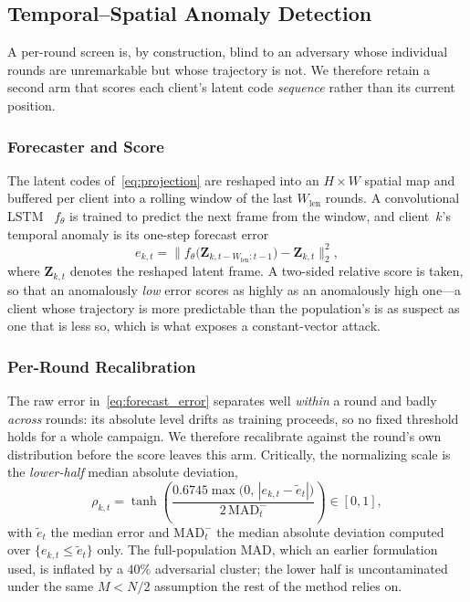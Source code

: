 \documentclass[journal]{IEEEtran}
\begin{document}
\subsection{Temporal--Spatial Anomaly Detection}
\label{sec:temporal}

A per-round screen is, by construction, blind to an adversary whose individual rounds are unremarkable but whose trajectory is not. We therefore retain a second arm that scores each client's latent code \emph{sequence} rather than its current position.

\subsubsection{Forecaster and Score}
The latent codes of~\eqref{eq:projection} are reshaped into an $H \times W$ spatial map and buffered per client into a rolling window of the last $W_{\mathrm{len}}$ rounds. A convolutional LSTM~\cite{shi2015convolutional} $f_\theta$ is trained to predict the next frame from the window, and client~$k$'s temporal anomaly is its one-step forecast error
\begin{equation}
e_{k,t} = \bigl\| f_\theta\bigl( \mathbf{Z}_{k,t-W_{\mathrm{len}}:t-1} \bigr) - \mathbf{Z}_{k,t} \bigr\|_2^2 ,
\label{eq:forecast_error}
\end{equation}
where $\mathbf{Z}_{k,t}$ denotes the reshaped latent frame. A two-sided relative score is taken, so that an anomalously \emph{low} error scores as highly as an anomalously high one---a client whose trajectory is more predictable than the population's is as suspect as one that is less so, which is what exposes a constant-vector attack.

\subsubsection{Per-Round Recalibration}
The raw error in~\eqref{eq:forecast_error} separates well \emph{within} a round and badly \emph{across} rounds: its absolute level drifts as training proceeds, so no fixed threshold holds for a whole campaign. We therefore recalibrate against the round's own distribution before the score leaves this arm. Critically, the normalizing scale is the \emph{lower-half} median absolute deviation,
\begin{equation}
\rho_{k,t} = \tanh\!\left( \frac{0.6745 \max\bigl(0,\, |e_{k,t} - \tilde{e}_t| \bigr)}{2\,\mathrm{MAD}^{-}_t} \right) \in [0,1],
\label{eq:temporal_rel}
\end{equation}
with $\tilde{e}_t$ the median error and $\mathrm{MAD}^-_t$ the median absolute deviation computed over $\{e_{k,t} \le \tilde{e}_t\}$ only. The full-population MAD, which an earlier formulation used, is inflated by a $40\%$ adversarial cluster; the lower half is uncontaminated under the same $M < N/2$ assumption the rest of the method relies on.
\end{document}
